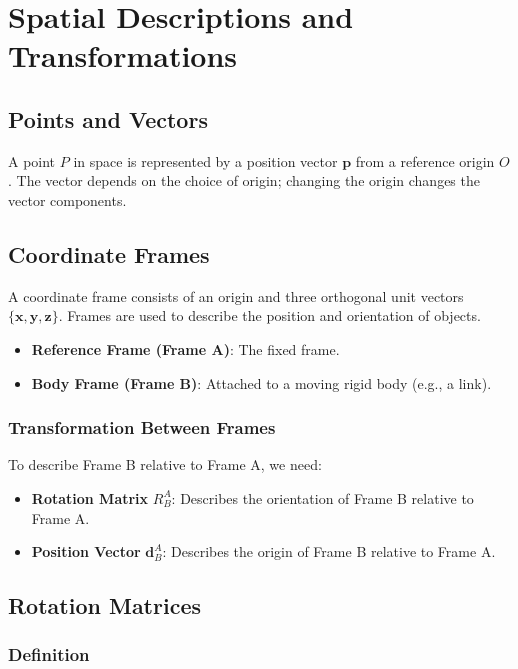 \documentclass{article}
\begin{document}
\section{Spatial Descriptions and Transformations}

\subsection{Points and Vectors}

A point $P$ in space is represented by a position vector $\mathbf{p}$ from a reference origin $O$. The vector depends on the choice of origin; changing the origin changes the vector components.

\subsection{Coordinate Frames}

A coordinate frame consists of an origin and three orthogonal unit vectors $\{\mathbf{x}, \mathbf{y}, \mathbf{z}\}$. Frames are used to describe the position and orientation of objects.

\begin{itemize}
    \item \textbf{Reference Frame (Frame A)}: The fixed frame.
    \item \textbf{Body Frame (Frame B)}: Attached to a moving rigid body (e.g., a link).
\end{itemize}

\subsubsection{Transformation Between Frames}

To describe Frame B relative to Frame A, we need:

\begin{itemize}
    \item \textbf{Rotation Matrix} $R^A_B$: Describes the orientation of Frame B relative to Frame A.
    \item \textbf{Position Vector} $\mathbf{d}^A_B$: Describes the origin of Frame B relative to Frame A.
\end{itemize}

\subsection{Rotation Matrices}

\subsubsection{Definition}
\end{document}
